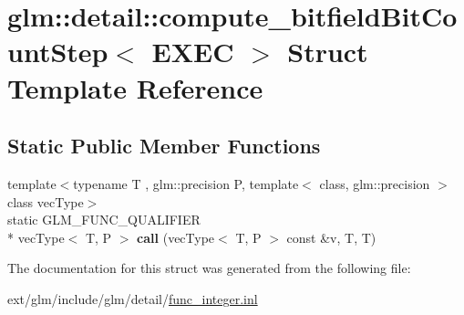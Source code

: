\hypertarget{structglm_1_1detail_1_1compute__bitfield_bit_count_step}{\section{glm\-:\-:detail\-:\-:compute\-\_\-bitfield\-Bit\-Count\-Step$<$ E\-X\-E\-C $>$ Struct Template Reference}
\label{structglm_1_1detail_1_1compute__bitfield_bit_count_step}
}
\subsection*{Static Public Member Functions}
\begin{DoxyCompactItemize}
\item 
\hypertarget{structglm_1_1detail_1_1compute__bitfield_bit_count_step_a138fcd5732e6cda3d8c6cc093e7f7f0f}{{\footnotesize template$<$typename T , glm\-::precision P, template$<$ class, glm\-::precision $>$ class vec\-Type$>$ }\\static G\-L\-M\-\_\-\-F\-U\-N\-C\-\_\-\-Q\-U\-A\-L\-I\-F\-I\-E\-R \\*
vec\-Type$<$ T, P $>$ {\bfseries call} (vec\-Type$<$ T, P $>$ const \&v, T, T)}\label{structglm_1_1detail_1_1compute__bitfield_bit_count_step_a138fcd5732e6cda3d8c6cc093e7f7f0f}

\end{DoxyCompactItemize}


The documentation for this struct was generated from the following file\-:\begin{DoxyCompactItemize}
\item 
ext/glm/include/glm/detail/\hyperlink{func__integer_8inl}{func\-\_\-integer.\-inl}\end{DoxyCompactItemize}
